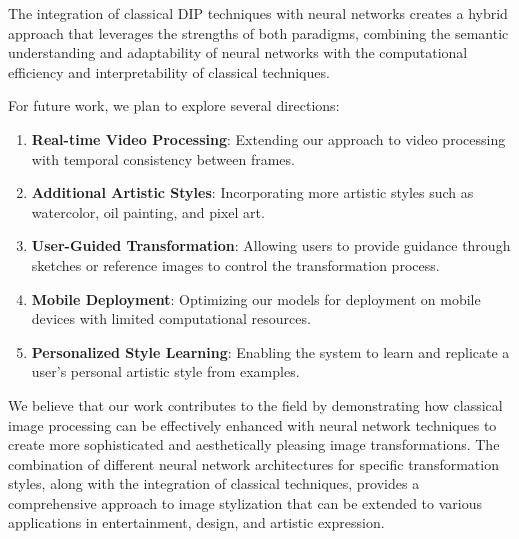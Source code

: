 \documentclass[conference]{IEEEtran}
\begin{document}
The integration of classical DIP techniques with neural networks creates a hybrid approach that leverages the strengths of both paradigms, combining the semantic understanding and adaptability of neural networks with the computational efficiency and interpretability of classical techniques.

For future work, we plan to explore several directions:

\begin{enumerate}
    \item \textbf{Real-time Video Processing}: Extending our approach to video processing with temporal consistency between frames.
    
    \item \textbf{Additional Artistic Styles}: Incorporating more artistic styles such as watercolor, oil painting, and pixel art.
    
    \item \textbf{User-Guided Transformation}: Allowing users to provide guidance through sketches or reference images to control the transformation process.
    
    \item \textbf{Mobile Deployment}: Optimizing our models for deployment on mobile devices with limited computational resources.
    
    \item \textbf{Personalized Style Learning}: Enabling the system to learn and replicate a user's personal artistic style from examples.
\end{enumerate}

We believe that our work contributes to the field by demonstrating how classical image processing can be effectively enhanced with neural network techniques to create more sophisticated and aesthetically pleasing image transformations. The combination of different neural network architectures for specific transformation styles, along with the integration of classical techniques, provides a comprehensive approach to image stylization that can be extended to various applications in entertainment, design, and artistic expression.
\end{document}
